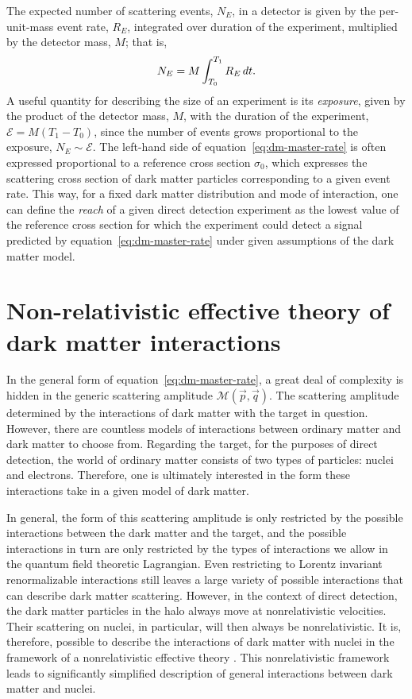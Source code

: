 The expected number of scattering events, $N_E$, in a detector is given by the per-unit-mass event rate, $R_E$, integrated over duration of the experiment, multiplied by the detector mass, $M$; that is,
\begin{equation}
    N_E=M\int_{T_0}^{T_1} R_E\,d t.
\end{equation}
A useful quantity for describing the size of an experiment is its \emph{exposure}, given by the product of the detector mass, $M$, with the duration of the experiment, $\mathcal{E}=M(T_1-T_0)$, since the number of events grows proportional to the exposure, $N_E\sim\mathcal{E}$. The left-hand side of equation~\eqref{eq:dm-master-rate} is often expressed proportional to a reference cross section $\sigma_0$, which expresses the scattering cross section of dark matter particles corresponding to a given event rate. This way, for a fixed dark matter distribution and mode of interaction, one can define the \emph{reach} of a given direct detection experiment as the lowest value of the reference cross section for which the experiment could detect a signal predicted by equation~\eqref{eq:dm-master-rate} under given assumptions of the dark matter model.

\section{Non-relativistic effective theory of dark matter interactions}
\label{chap:eft}

In the general form of equation~\eqref{eq:dm-master-rate}, a great deal of complexity is hidden in the generic scattering amplitude $\mathcal{M}(\vec{p},\vec{q})$. The scattering amplitude determined by the interactions of dark matter with the target in question. However, there are countless models of interactions between ordinary matter and dark matter to choose from. Regarding the target, for the purposes of direct detection, the world of ordinary matter consists of two types of particles: nuclei and electrons. Therefore, one is ultimately interested in the form these interactions take in a given model of dark matter.

In general, the form of this scattering amplitude is only restricted by the possible interactions between the dark matter and the target, and the possible interactions in turn are only restricted by the types of interactions we allow in the quantum field theoretic Lagrangian. Even restricting to Lorentz invariant renormalizable interactions still leaves a large variety of possible interactions that can describe dark matter scattering. However, in the context of direct detection, the dark matter particles in the halo always move at nonrelativistic velocities. Their scattering on nuclei, in particular, will then always be nonrelativistic. It is, therefore, possible to describe the interactions of dark matter with nuclei in the framework of a nonrelativistic effective theory \parencite{FitzpatrickEtAl2013}. This nonrelativistic framework leads to significantly simplified description of general interactions between dark matter and nuclei.

